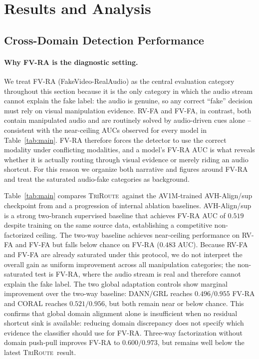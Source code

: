 \documentclass{article}
\newcommand{\method}{\textsc{TriRoute}}
\begin{document}
\section{Results and Analysis}

\subsection{Cross-Domain Detection Performance}

\paragraph{Why FV-RA is the diagnostic setting.}
We treat FV-RA (FakeVideo-RealAudio) as the central evaluation category throughout this section because it is the only category in which the audio stream cannot explain the fake label: the audio is genuine, so any correct ``fake'' decision must rely on visual manipulation evidence. RV-FA and FV-FA, in contrast, both contain manipulated audio and are routinely solved by audio-driven cues alone -- consistent with the near-ceiling AUCs observed for every model in Table~\ref{tab:main}. FV-RA therefore forces the detector to use the correct modality under conflicting modalities, and a model's FV-RA AUC is what reveals whether it is actually routing through visual evidence or merely riding an audio shortcut. For this reason we organize both narrative and figures around FV-RA and treat the saturated audio-fake categories as background.

Table~\ref{tab:main} compares \method\ against the AV1M-trained AVH-Align/sup checkpoint from \citet{smeu2025avhalign} and a progression of internal ablation baselines. AVH-Align/sup is a strong two-branch supervised baseline that achieves FV-RA AUC of $0.519$ despite training on the same source data, establishing a competitive non-factorized ceiling. The two-way baseline achieves near-ceiling performance on RV-FA and FV-FA but falls below chance on FV-RA ($0.483$ AUC). Because RV-FA and FV-FA are already saturated under this protocol, we do not interpret the overall gain as uniform improvement across all manipulation categories; the non-saturated test is FV-RA, where the audio stream is real and therefore cannot explain the fake label. The two global adaptation controls show marginal improvement over the two-way baseline: DANN/GRL reaches $0.496/0.955$ FV-RA and CORAL reaches $0.521/0.956$, but both remain near or below chance. This confirms that global domain alignment alone is insufficient when no residual shortcut sink is available: reducing domain discrepancy does not specify which evidence the classifier should use for FV-RA. Three-way factorization without domain push-pull improves FV-RA to $0.600/0.973$, but remains well below the latest \method\ result.
\end{document}
